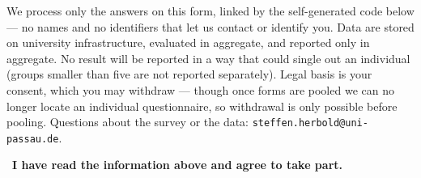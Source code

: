 \noindent
We process only the answers on this form, linked by the self-generated code below --- no names and no
identifiers that let us contact or identify you. Data are stored on university infrastructure, evaluated
in aggregate, and reported only in aggregate. No result will be reported
in a way that could single out an individual (groups smaller than five are not reported separately).
Legal basis is your consent, which you may withdraw --- though once forms are pooled we can no longer
locate an individual questionnaire, so withdrawal is only possible before pooling. Questions about the
survey or the data: \texttt{steffen.herbold@uni-passau.de}.

\vspace{0.6em}
\noindent\bx~\textbf{I have read the information above and agree to take part.}

\vspace{0.4em}


